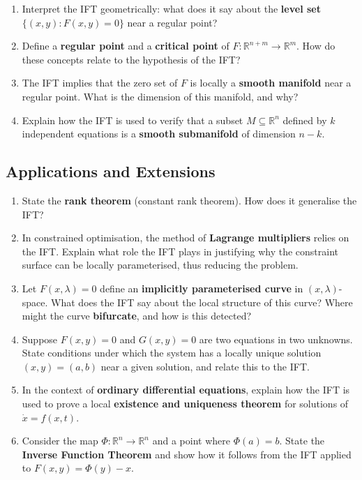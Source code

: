 \begin{enumerate}[resume, leftmargin=*, label=\textbf{Q\arabic*.}]

\item Interpret the IFT geometrically: what does it say about the \textbf{level set} $\{(x,y) : F(x,y) = 0\}$ near a regular point?

\item Define a \textbf{regular point} and a \textbf{critical point} of $F : \mathbb{R}^{n+m} \to \mathbb{R}^m$. How do these concepts relate to the hypothesis of the IFT?

\item The IFT implies that the zero set of $F$ is locally a \textbf{smooth manifold} near a regular point. What is the dimension of this manifold, and why?

\item Explain how the IFT is used to verify that a subset $M \subseteq \mathbb{R}^n$ defined by $k$ independent equations is a \textbf{smooth submanifold} of dimension $n - k$.

\end{enumerate}

\subsection{Applications and Extensions}

\begin{enumerate}[resume, leftmargin=*, label=\textbf{Q\arabic*.}]

\item State the \textbf{rank theorem} (constant rank theorem). How does it generalise the IFT?

\item In constrained optimisation, the method of \textbf{Lagrange multipliers} relies on the IFT. Explain what role the IFT plays in justifying why the constraint surface can be locally parameterised, thus reducing the problem.

\item Let $F(x, \lambda) = 0$ define an \textbf{implicitly parameterised curve} in $(x,\lambda)$-space. What does the IFT say about the local structure of this curve? Where might the curve \textbf{bifurcate}, and how is this detected?

\item Suppose $F(x,y) = 0$ and $G(x,y) = 0$ are two equations in two unknowns. State conditions under which the system has a locally unique solution $(x,y) = (a,b)$ near a given solution, and relate this to the IFT.

\item In the context of \textbf{ordinary differential equations}, explain how the IFT is used to prove a local \textbf{existence and uniqueness theorem} for solutions of $\dot{x} = f(x,t)$.

\item Consider the map $\Phi : \mathbb{R}^n \to \mathbb{R}^n$ and a point where $\Phi(a) = b$. State the \textbf{Inverse Function Theorem} and show how it follows from the IFT applied to $F(x,y) = \Phi(y) - x$.

\end{enumerate}

